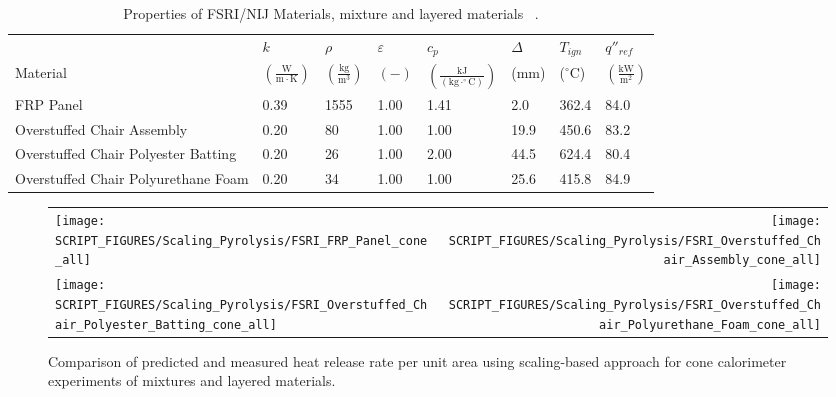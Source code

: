 \begin{table}[!h]
\caption[Properties of FSRI/NIJ Materials, mixture and layered materials]{Properties of FSRI/NIJ Materials, mixture and layered materials ~\cite{McKinnon:FSRI2023_Data}.}
\centering
\begin{tabular}{|p{5.5cm}|p{1.0cm}|p{1.0cm}|p{0.8cm}|p{1.4cm}|p{1.0cm}|p{1.0cm}|p{1.2cm}|}
\hline
                                               & $k$    & $\rho$      & $\varepsilon$   & $c_{p}$ & $\Delta$    & $T_{ign}$ & $q''_{ref}$ \\
Material                                       & $\mathrm{\left(\frac{W}{m\cdot K}\right)}$ & $\mathrm{\left(\frac{kg}{m^{3}}\right)}$ & $\mathrm{( - )}$ & $\mathrm{\left(\frac{kJ}{(kg\cdot ^{\circ}C)}\right)}$ &  ($\mathrm{mm}$)   & ($\mathrm{^{\circ}C}$) & $\mathrm{\left(\frac{kW}{m^{2}}\right)}$ \\ \hline
\hline
FRP Panel & 0.39 & 1555 & 1.00 & 1.41 & 2.0 & 362.4 & 84.0 \\ \hline
Overstuffed Chair Assembly & 0.20 & 80 & 1.00 & 1.00 & 19.9 & 450.6 & 83.2 \\ \hline
Overstuffed Chair Polyester Batting & 0.20 & 26 & 1.00 & 2.00 & 44.5 & 624.4 & 80.4 \\ \hline
Overstuffed Chair Polyurethane Foam & 0.20 & 34 & 1.00 & 1.00 & 25.6 & 415.8 & 84.9 \\ \hline
\end{tabular}
\label{Properties_FSRI_NIJ_Materials_mixtures}
\end{table}

\begin{figure}[p]
\begin{tabular*}{\textwidth}{l@{\extracolsep{\fill}}r}
\texttt{[image: SCRIPT\_FIGURES/Scaling\_Pyrolysis/FSRI\_FRP\_Panel\_cone\_all]} &
\texttt{[image: SCRIPT\_FIGURES/Scaling\_Pyrolysis/FSRI\_Overstuffed\_Chair\_Assembly\_cone\_all]} \\
\texttt{[image: SCRIPT\_FIGURES/Scaling\_Pyrolysis/FSRI\_Overstuffed\_Chair\_Polyester\_Batting\_cone\_all]} &
\texttt{[image: SCRIPT\_FIGURES/Scaling\_Pyrolysis/FSRI\_Overstuffed\_Chair\_Polyurethane\_Foam\_cone\_all]} \\
\end{tabular*}
\caption[HRRPUA of FSRI materials using scaling model, mixtures and layered materials]
{Comparison of predicted and measured heat release rate per unit area using scaling-based approach for cone calorimeter experiments of mixtures and layered materials.}
\label{FSRI_Materials_mixtures}
\end{figure}

